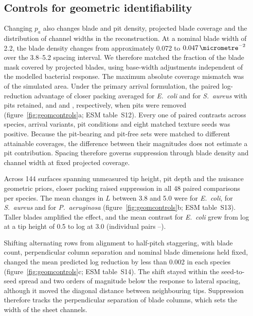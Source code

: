 \documentclass[11pt]{article}
\newcommand{\Ec}{\textit{E.~coli}}
\newcommand{\Sa}{\textit{S.~aureus}}
\newcommand{\Pa}{\textit{P.~aeruginosa}}
\begin{document}
\subsection{Controls for geometric identifiability}
Changing $p_a$ also changes blade and pit density, projected blade coverage and the distribution of channel widths in the reconstruction. At a nominal blade width of \SI{2.2}{\micrometre}, the blade density changes from approximately 0.072 to $0.047\,\si{\micrometre}^{-2}$ over the 3.8--\SI{5.2}{\micrometre} spacing interval. We therefore matched the fraction of the blade mask covered by projected blades, using base-width adjustments independent of the modelled bacterial response. The maximum absolute coverage mismatch was \GeomMaxCovErr{} of the simulated area. Under the primary arrival formulation, the paired log-reduction advantage of closer packing averaged \GeomEcCovPit{} for \Ec{} and \GeomSaCovPit{} for \Sa{} with pits retained, and \GeomEcCovNoPit{} and \GeomSaCovNoPit{}, respectively, when pits were removed (figure~\ref{fig:geomcontrols}a; ESM table~S12). Every one of \GeomNtotalCoverage{} paired contrasts across species, arrival variants, pit conditions and eight matched texture seeds was positive. Because the pit-bearing and pit-free sets were matched to different attainable coverages, the difference between their magnitudes does not estimate a pit contribution. Spacing therefore governs suppression through blade density and channel width at fixed projected coverage.

Across 144 surfaces spanning unmeasured tip height, pit depth and the nuisance geometric priors, closer packing raised suppression in all 48 paired comparisons per species. The mean changes in $L$ between 3.8 and \SI{5.0}{\micrometre} were \GeomFactEc{} for \Ec{}, \GeomFactSa{} for \Sa{} and \GeomFactPa{} for \Pa{} (figure~\ref{fig:geomcontrols}b; ESM table~S13). Taller blades amplified the effect, and the mean contrast for \Ec{} grew from \GeomFactEcLow{} log at a tip height of \SI{0.5}{\micrometre} to \GeomFactEcHigh{} log at \SI{3.0}{\micrometre} (individual pairs \GeomFactEcMin{}--\GeomFactEcMax{}).

Shifting alternating rows from alignment to half-pitch staggering, with blade count, perpendicular column separation and nominal blade dimensions held fixed, changed the mean predicted log reduction by less than 0.002 in each species (figure~\ref{fig:geomcontrols}c; ESM table~S14). The shift stayed within the seed-to-seed spread and two orders of magnitude below the response to lateral spacing, although it moved the diagonal distance between neighbouring tips. Suppression therefore tracks the perpendicular separation of blade columns, which sets the width of the sheet channels.
\end{document}
